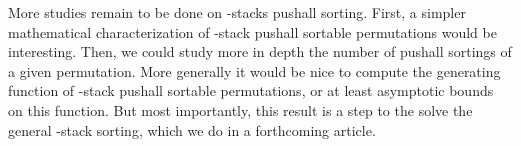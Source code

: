 \documentclass[11pt]{article}
\newcommand{\pushall}{-stack pushall sortable\xspace}
\begin{document}
More studies remain to be done on -stacks pushall sorting.
First, a simpler mathematical characterization of \pushall permutations would be interesting.
Then, we could study more in depth the number of pushall sortings of a given permutation.
More generally it would be nice to compute the generating function of \pushall permutations,
or at least asymptotic bounds on this function.
But most importantly, this result is a step to the solve the general -stack sorting,
which we do in a forthcoming article.



\end{document}
